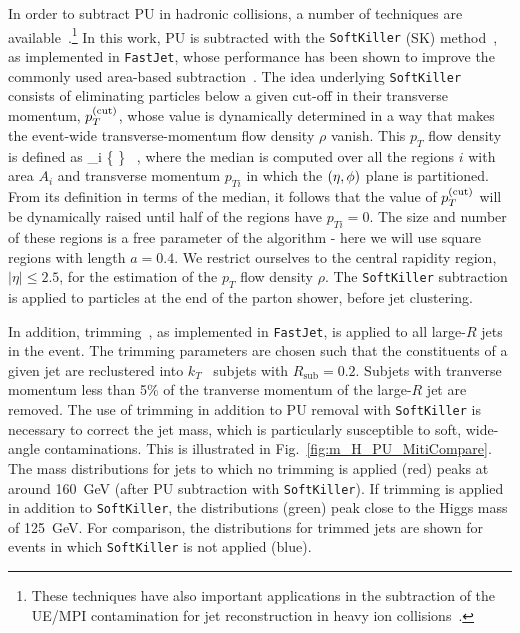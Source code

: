 %
In order to subtract PU in hadronic collisions, a number of techniques
are available~\cite{Cacciari:2009dp,TheATLAScollaboration:2013pia,Butterworth:2008iy,Cacciari:2007fd,Krohn:2009th,Krohn:2013lba,Ellis:2009me,Bertolini:2014bba,Cacciari:2014gra,Cacciari:2014jta,Berta:2014eza,Larkoski:2014wba}.\footnote{
These techniques have also important applications in the subtraction
of the UE/MPI contamination for jet reconstruction
in heavy ion collisions~\cite{Cacciari:2010te}.
}
%
In this work, PU  is subtracted
with the {\tt SoftKiller} (SK)
method~\cite{Cacciari:2014gra}, as implemented in {\tt FastJet},
whose performance has been shown to
improve the commonly used area-based subtraction~\cite{Cacciari:2009dp}.
%
The idea underlying {\tt SoftKiller} consists of eliminating particles
below a given cut-off in their transverse momentum, $p_T^{\rm (cut)}$, whose
value is dynamically determined in a way that makes the event-wide
transverse-momentum flow density $\rho$ vanish.
%
This $p_T$ flow density is defined as
\be
\rho{}_i \Bigg\{ \Bigg\} \, ,
\ee
where the median is computed over all the regions $i$ with area
$A_i$ and transverse momentum $p_{Ti}$ in which the $\left( \eta,\phi\right)$ plane
is partitioned.
%
From its definition in terms of the median,
it follows that the value of $p_T^{(\rm cut)}$
will be dynamically raised until half of the regions have
$p_{Ti}=0$.
%
The size and number of these regions is a free parameter of the algorithm -
here we will use square regions with length $a=0.4$.
%
We restrict ourselves to the central rapidity region,
$|\eta| \le 2.5$, for the estimation of the
$p_T$ flow density $\rho$.
%
The {\tt SoftKiller} subtraction is applied to particles at the end of the parton shower, before
jet clustering.

In addition, trimming~\cite{Krohn:2009th}, as implemented in {\tt FastJet}, is applied to all large-$R$ jets in the event.
The trimming parameters are chosen such that the constituents of a given jet are reclustered into $k_T$~\cite{Ellis:1993tq} 
subjets with $R_{\textrm{sub}} = 0.2$.
Subjets with tranverse momentum less than 5\% of the tranverse momentum of the large-$R$ jet are removed.
The use of trimming in addition to PU removal with {\tt SoftKiller} is necessary to correct the jet mass, which is particularly susceptible
to soft, wide-angle contaminations. This is illustrated in Fig.~\ref{fig:m_H_PU_MitiCompare}. The mass distributions for jets to which no trimming
is applied (red) peaks at around 160~GeV (after PU subtraction with {\tt SoftKiller}). If trimming is applied in addition to {\tt SoftKiller}, 
the distributions (green) peak close to the Higgs mass of 125~GeV. For comparison, the distributions for trimmed jets are shown for events 
in which {\tt SoftKiller} is not applied (blue).

